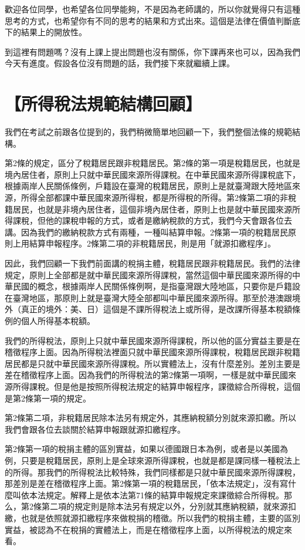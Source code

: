 \documentclass[]{ctexbook}
\begin{document}
歡迎各位同學，也希望各位同學能夠，不是因為老師講的，所以你就覺得只有這種思考的方式，也希望你有不同的思考的結果和方式出來。這個是法律在價值判斷底下的結果上的開放性。

到這裡有問題嗎？沒有上課上提出問題也沒有關係，你下課再來也可以，因為我們今天有進度。假設各位沒有問題的話，我們接下來就繼續上課。

\hypertarget{ux6240ux5f97ux7a05ux6cd5ux898fux7bc4ux7d50ux69cbux56deux9867}{%
\section{【所得稅法規範結構回顧】}\label{ux6240ux5f97ux7a05ux6cd5ux898fux7bc4ux7d50ux69cbux56deux9867}}

我們在考試之前跟各位提到的，我們稍微簡單地回顧一下，我們整個法條的規範結構。

第2條的規定，區分了稅籍居民跟非稅籍居民。第2條的第一項是稅籍居民，也就是境內居住者，原則上只就中華民國來源所得課稅。在中華民國來源所得課稅底下，根據兩岸人民關係條例，戶籍設在臺灣的稅籍居民，原則上是就臺灣跟大陸地區來源，所得全部都課中華民國來源所得稅，都是所得稅的所得。第2條第二項的非稅籍居民，也就是非境內居住者，這個非境內居住者，原則上也是就中華民國來源所得課稅，但他的課稅申報的方式，或者是繳納稅款的方式，我們今天會跟各位去講。因為我們的繳納稅款方式有兩種，一種叫結算申報。2條第一項的稅籍居民原則上用結算申報程序。2條第二項的非稅籍居民，則是用「就源扣繳程序」。

因此，我們回顧一下我們前面講的稅捐主體，稅籍居民跟非稅籍居民。我們的法律規定，原則上全部都是就中華民國來源所得課稅，當然這個中華民國來源所得的中華民國的概念，根據兩岸人民關係條例啊，是指臺灣跟大陸地區，只要你是戶籍設在臺灣地區，那原則上就是臺灣大陸全部都叫中華民國來源所得。那至於港澳跟境外（真正的境外：美、日）這個是不課所得稅法上或所得，是改課所得基本稅額條例的個人所得基本稅額。

我們的所得稅法，原則上只就中華民國來源所得課稅，所以他的區分實益主要是在稽徵程序上面。因為所得稅法裡面只就中華民國來源所得課稅，稅籍居民跟非稅籍居民都是只就中華民國來源所得課稅。所以實體法上，沒有什麼差別。差別主要是差在稽徵程序上面。因為我們的所得稅法的第2條第一項啊，一樣是就中華民國來源所得課稅。但是他是按照所得稅法規定的結算申報程序，課徵綜合所得稅，這個是第2條第一項的規定。

第2條第二項，非稅籍居民除本法另有規定外，其應納稅額分別就來源扣繳。所以我們會跟各位去談關於結算申報跟就源扣繳程序。

第2條第一項的稅捐主體的區別實益，如果以德國跟日本為例，或者是以美國為例，只要是稅籍居民，原則上是全球來源所得課稅，也就是都是課同樣一種稅法上的所得。那我們的所得稅法比較特殊，我們同樣都是只就中華民國來源所得課稅，那差別是差在稽徵程序上面。第2條第一項的稅籍居民，「依本法規定」，沒有寫什麼叫依本法規定。解釋上是依本法第71條的結算申報規定來課徵綜合所得稅。那么，第2條第二項的規定則是除本法另有規定以外，分別就其應納稅額，就來源扣繳，也就是依照就源扣繳程序來做稅捐的稽徵。所以我們的稅捐主體，主要的區別實益，被認為不在稅捐的實體法上，而是在稽徵程序上面，以所得稅法的規定來看。
\end{document}
